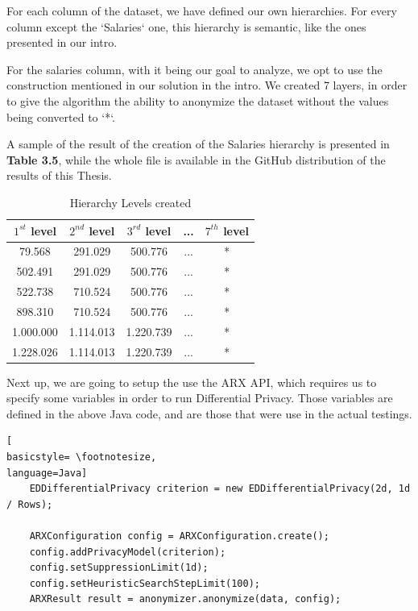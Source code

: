 For each column of the dataset, we have defined our own hierarchies. For every column except the `Salaries` one, this hierarchy is semantic, like the ones presented in our intro.

For the salaries column, with it being our goal to analyze, we opt to use the construction mentioned in our solution in the intro. We created 7 layers, in order to give the algorithm the ability to anonymize the dataset without the values being converted to `*`.

A sample of the result of the creation of the Salaries hierarchy is presented in \textbf{Table 3.5}, while the whole file is available in the GitHub distribution of the results of this Thesis.

\begin{table}[!htb]
    \centering

    \caption{Hierarchy Levels created}
    \label{numbers}

    \begin{tabular}{| c | c | c | c | c|}
      \hline 
      $1^{st}$ level & $2^{nd}$ level & $3^{rd}$ level & ... & $7^{th}$ level \\
      \hline
        79.568  &	291.029 & 500.776 &   	... &	*\\
              \hline
        502.491 &	291.029 &	500.776 &... &	*\\
              \hline
        522.738 &	710.524 &	500.776 &...	&   *\\
              \hline
        898.310 &	710.524 &	500.776 &... &	*\\
              \hline
        1.000.000 &	1.114.013 &   1.220.739 &...&	*\\
              \hline
        1.228.026 &	1.114.013 &   1.220.739 &... &	*\\
              \hline
    \end{tabular}
\end{table}

Next up, we are going to setup the use the ARX API, which requires us to specify some variables in order to run Differential Privacy. Those variables are defined in the above Java code, and are those that were use in the actual testings.

\bigskip
\bigskip
\bigskip
\bigskip
\begin{lstlisting}[
basicstyle= \footnotesize,
language=Java]
    EDDifferentialPrivacy criterion = new EDDifferentialPrivacy(2d, 1d / Rows);

    ARXConfiguration config = ARXConfiguration.create();
    config.addPrivacyModel(criterion);
    config.setSuppressionLimit(1d);
    config.setHeuristicSearchStepLimit(100);
    ARXResult result = anonymizer.anonymize(data, config);
\end{lstlisting}
\bigskip


